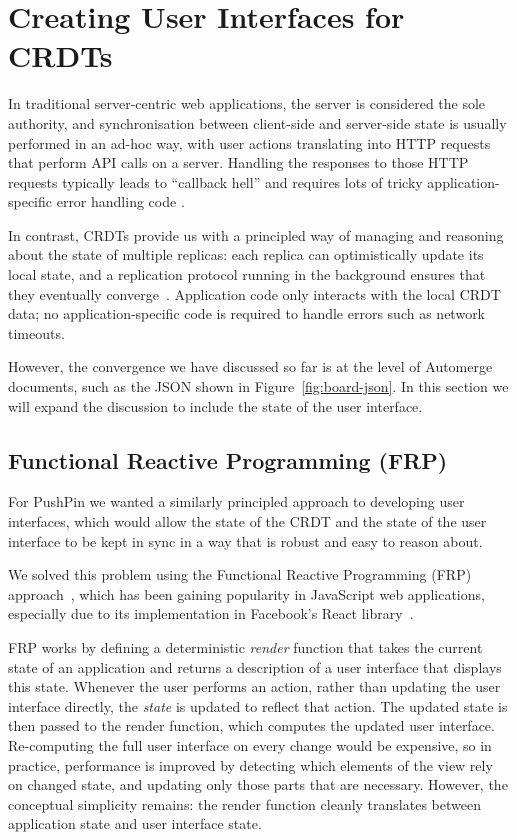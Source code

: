 \documentclass[sigplan,10pt]{acmart}
\begin{document}
\section{Creating User Interfaces for CRDTs}\label{sec:data-model-ui}

In traditional server-centric web applications, the server is considered the sole authority, and synchronisation between client-side and server-side state is usually performed in an ad-hoc way, with user actions translating into HTTP requests that perform API calls on a server.
Handling the responses to those HTTP requests typically leads to ``callback hell'' and requires lots of tricky application-specific error handling code \cite{Mogk2018distributedRP}.

In contrast, CRDTs provide us with a principled way of managing and reasoning about the state of multiple replicas: each replica can optimistically update its local state, and a replication protocol running in the background ensures that they eventually converge~\cite{Saito:2005jw}.
Application code only interacts with the local CRDT data; no application-specific code is required to handle errors such as network timeouts.

However, the convergence we have discussed so far is at the level of Automerge documents, such as the JSON shown in Figure~\ref{fig:board-json}.
In this section we will expand the discussion to include the state of the user interface.

\subsection{Functional Reactive Programming (FRP)}

For PushPin we wanted a similarly principled approach to developing user interfaces, which would allow the state of the CRDT and the state of the user interface to be kept in sync in a way that is robust and easy to reason about.

We solved this problem using the Functional Reactive Programming (FRP) approach~\cite{Czaplicki:2013ig,Mogk2018distributedRP}, which has been gaining popularity in JavaScript web applications, especially due to its implementation in Facebook's React library~\cite{React}.

FRP works by defining a deterministic \emph{render} function that takes the current state of an application and returns a description of a user interface that displays this state.
Whenever the user performs an action, rather than updating the user interface directly, the \emph{state} is updated to reflect that action.
The updated state is then passed to the render function, which computes the updated user interface.
Re-computing the full user interface on every change would be expensive, so in practice, performance is improved by detecting which elements of the view rely on changed state, and updating only those parts that are necessary.
However, the conceptual simplicity remains: the render function cleanly translates between application state and user interface state.
\end{document}
